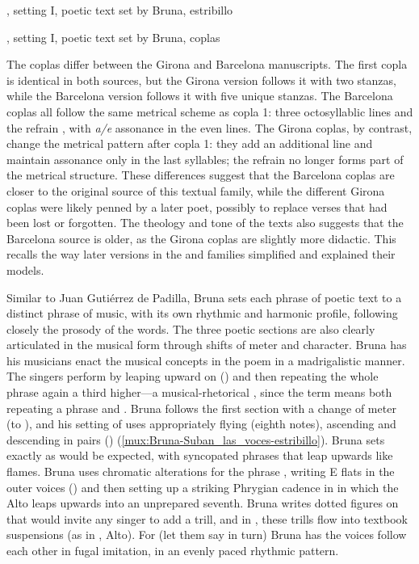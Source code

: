 {, setting I, poetic text set by Bruna,
estribillo}

{, setting I, poetic text set by Bruna, coplas}

The coplas differ between the Girona and Barcelona manuscripts.
The first copla is identical in both sources, but the Girona version follows it
with two stanzas, while the Barcelona version follows it with five unique
stanzas.
The Barcelona coplas all follow the same metrical scheme as copla 1: three
octosyllablic lines and the refrain , with \emph{a/e} assonance
in the even lines.
The Girona coplas, by contrast, change the metrical pattern after copla 1: they
add an additional line and maintain assonance only in the last syllables; the
 refrain no longer forms part of the metrical structure.
These differences suggest that the Barcelona coplas are closer to the original
source of this textual family, while the different Girona coplas were likely
penned by a later poet, possibly to replace verses that had been lost or
forgotten.
The theology and tone of the texts also suggests that the Barcelona source is
older, as the Girona coplas are slightly more didactic.
This recalls the way later versions in the  and  families simplified and explained their
models.

Similar to Juan Gutiérrez de Padilla, Bruna sets each phrase of poetic text to
a distinct phrase of music, with its own rhythmic and harmonic profile,
following closely the prosody of the words.  
The three poetic sections are also clearly articulated in the musical form
through shifts of meter and character.
Bruna has his musicians enact the musical concepts in the poem in a
madrigalistic manner.  
The singers perform  by leaping upward on
 () and then repeating the whole phrase again a
third higher---a musical-rhetorical , since the term means both
repeating a phrase and .
Bruna follows the first section with a change of meter (to \meterC), and his
setting of  uses appropriately
flying  (eighth notes), ascending and descending in pairs
() (\cref{mux:Bruna-Suban_las_voces-estribillo}).
Bruna sets  exactly as would be expected, with
syncopated phrases that leap upwards like flames.
Bruna uses chromatic alterations for the phrase ,
writing E flats in the outer voices () and then setting up a
striking Phrygian cadence in  in which the Alto leaps upwards
into an unprepared seventh.  
Bruna writes dotted figures on  that would
invite any singer to add a trill, and in , these trills flow
into textbook suspensions (as in , Alto).
For  (let them say in turn) Bruna has the voices follow
each other in fugal imitation, in an evenly paced rhythmic pattern.

